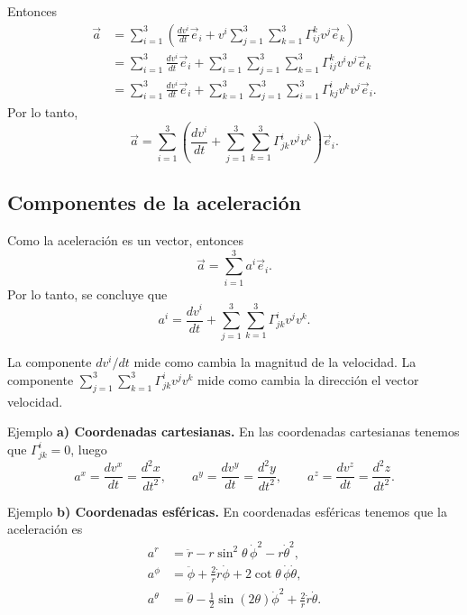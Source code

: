 \documentclass[../apunte_mecanica_clasica.tex]{subfiles}%
\begin{document}
Entonces
\begin{align*}
    \vec a
    &=\sum_{i=1}^{3}\left(\frac{dv^i}{dt}\vec e_i+v^i\sum_{j=1}^{3}\sum_{k=1}^{3}\Gamma^{k}_{ij}v^j\vec e_k\right) \\
    &=\sum_{i=1}^{3}\frac{dv^i}{dt}\vec e_i
      +\sum_{i=1}^{3}\sum_{j=1}^{3}\sum_{k=1}^{3}\Gamma^{k}_{ij}v^iv^j\vec e_k \\
    &=\sum_{i=1}^{3}\frac{dv^i}{dt}\vec e_i
      +\sum_{k=1}^{3}\sum_{j=1}^{3}\sum_{i=1}^{3}\Gamma^{i}_{kj}v^kv^j\vec e_i.
\end{align*}
Por lo tanto,
\begin{equation}
    \vec a=\sum_{i=1}^{3}\left(\frac{dv^i}{dt}+\sum_{j=1}^{3}\sum_{k=1}^{3}\Gamma^{i}_{jk}v^jv^k\right)\vec e_i.
    \label{eq:mecanica-aceleracion-general}
\end{equation}
\subsection{Componentes de la aceleración}

Como la aceleración es un vector, entonces
\begin{equation}
    \vec a=\sum_{i=1}^{3}a^i\vec e_i.
    \label{eq:mecanica-aceleracion-componentes}
\end{equation}
Por lo tanto, se concluye que
\begin{equation}
    a^i=\frac{dv^i}{dt}+\sum_{j=1}^{3}\sum_{k=1}^{3}\Gamma^{i}_{jk}v^jv^k.
    \label{eq:mecanica-componentes-aceleracion-general}
\end{equation}

La componente $dv^i/dt$ mide como cambia la magnitud de la velocidad. La componente $\sum_{j=1}^{3}\sum_{k=1}^{3}\Gamma^{i}_{jk}v^jv^k$ mide como cambia la dirección el vector velocidad.

\begin{apuntebloque}{Ejemplo}
\textbf{a) Coordenadas cartesianas.} En las coordenadas cartesianas tenemos que $\Gamma^{i}_{jk}=0$, luego
\begin{equation*}
    a^x=\frac{dv^x}{dt}=\frac{d^2x}{dt^2},
    \qquad
    a^y=\frac{dv^y}{dt}=\frac{d^2y}{dt^2},
    \qquad
    a^z=\frac{dv^z}{dt}=\frac{d^2z}{dt^2}.
\end{equation*}
\end{apuntebloque}

\begin{apuntebloque}{Ejemplo}
\textbf{b) Coordenadas esféricas.} En coordenadas esféricas tenemos que la aceleración es
\begin{align*}
    a^r&=\ddot r-r\sin^2\theta\,\dot\phi^2-r\dot\theta^2,\\
    a^\phi&=\ddot\phi+\frac{2}{r}\dot r\dot\phi+2\cot\theta\,\dot\phi\dot\theta,\\
    a^\theta&=\ddot\theta-\frac{1}{2}\sin(2\theta)\dot\phi^2+\frac{2}{r}\dot r\dot\theta.
\end{align*}
\end{apuntebloque}
\end{document}
